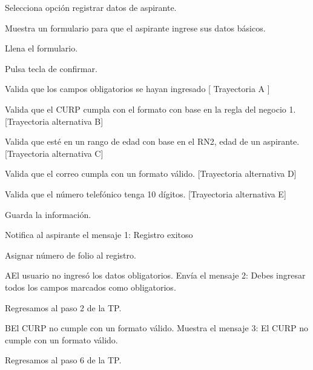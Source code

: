 \begin{UCtrayectoria}
	
	\UCpaso[\UCactor] Selecciona opción registrar datos de aspirante.
	
	\UCpaso[\UCsist] Muestra un formulario para que el aspirante ingrese sus datos básicos.
	
	\UCpaso[\UCactor] Llena el formulario.
	
	\UCpaso[\UCactor] Pulsa tecla de confirmar. 
	
	\UCpaso[\UCsist] Valida que los campos obligatorios se hayan ingresado [ Trayectoria A ]
	
	\UCpaso[\UCsist] Valida que el CURP cumpla con el formato con base en la regla del negocio 1. [Trayectoria alternativa B]
	
	\UCpaso[\UCsist] Valida que esté en un rango de edad con base en el RN2, edad de un aspirante. [Trayectoria alternativa C]
	
	\UCpaso[\UCsist] Valida que el correo cumpla con un formato válido. [Trayectoria alternativa D]

	\UCpaso[\UCsist] Valida que el número telefónico tenga 10 dígitos. [Trayectoria alternativa E]

	\UCpaso[\UCsist] Guarda la información.

	\UCpaso[\UCsist] Notifica al aspirante el mensaje 1: Registro exitoso

	\UCpaso[\UCsist] Asignar número de folio al registro.
	
\end{UCtrayectoria}


\begin{UCtrayectoriaA}{A}{El usuario no ingresó los datos obligatorios.}
	\UCpaso[\UCsist] Envía el mensaje 2: Debes ingresar todos los campos marcados como obligatorios.
			
	\UCpaso[] Regresamos al paso 2 de la TP.
	
\end{UCtrayectoriaA}

\begin{UCtrayectoriaA}{B}{El CURP no cumple con un formato válido.}
	\UCpaso[\UCsist] Muestra el mensaje 3: El CURP no cumple con un formato válido.
			
	\UCpaso[] Regresamos al paso 6 de la TP.
	
\end{UCtrayectoriaA}

